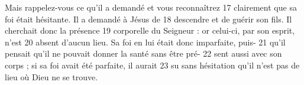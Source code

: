 Mais rappelez-vous ce qu'il a demandé et vous reconnaîtrez	 
17	 	clairement que sa foi était hésitante. Il a demandé à Jésus de	 
18	 	descendre et de guérir son fils. Il cherchait donc la présence	 
19	 	corporelle du Seigneur : or celui-ci, par son esprit, n'est	 
20	 	absent d'aucun lieu. Sa foi en lui était donc imparfaite, puis-	 
21	 	qu'il pensait qu'il ne pouvait donner la santé sans être pré-	 
22	 	sent aussi avec son corps ; si sa foi avait été parfaite, il aurait	 
23	 	su sans hésitation qu'il n'est pas de lieu où Dieu ne se trouve.